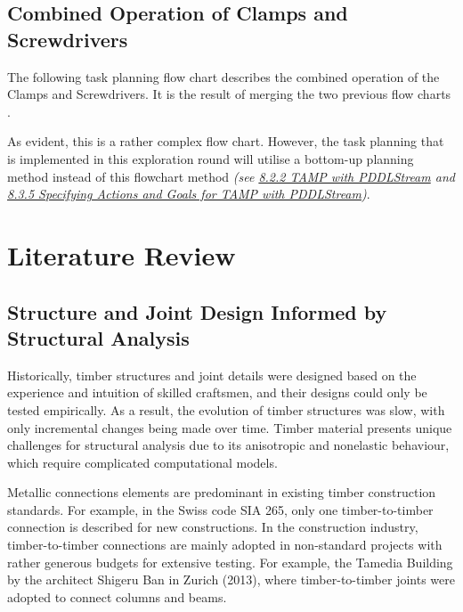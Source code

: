 \subsection{Combined Operation of Clamps and Screwdrivers}
\label{subsection:exploration-5-combined-operation-of-clamps-and-screwdrivers}

The following task planning flow chart describes the combined operation of the Clamps and Screwdrivers. It is the result of merging the two previous flow charts .




As evident, this is a rather complex flow chart. However, the task planning that is implemented in this exploration round will utilise a bottom-up planning method instead of this flowchart method \textit{(see \ul{8.2.2 TAMP with PDDLStream} and \ul{8.3.5 Specifying Actions and Goals for TAMP with PDDLStream})}.

\section{Literature Review}
\label{section:exploration-5-literature-review}

\subsection{Structure and Joint Design Informed by Structural Analysis}
\label{subsection:exploration-5-structure-and-joint-design-informed-by-structural-analysis}

Historically, timber structures and joint details were designed based on the experience and intuition of skilled craftsmen, and their designs could only be tested empirically. As a result, the evolution of timber structures was slow, with only incremental changes being made over time. Timber material presents unique challenges for structural analysis due to its anisotropic and nonelastic behaviour, which require complicated computational models. 

Metallic connections elements are predominant in existing timber construction standards. For example, in the Swiss code SIA 265, only one timber-to-timber connection is described for new constructions. In the construction industry, timber-to-timber connections are mainly adopted in non-standard projects with rather generous budgets for extensive testing. For example, the Tamedia Building by the architect Shigeru Ban in Zurich (2013), where timber-to-timber joints were adopted to connect columns and beams. \parencite{tanadiniAnalysisDesignTimbertotimber2021}

